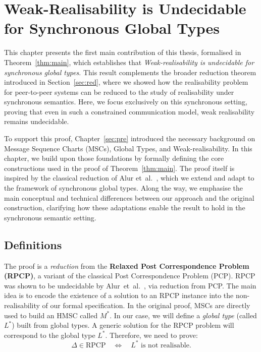 \chapter{Weak-Realisability is Undecidable for Synchronous Global Types}
\label{sec:proof}

This chapter presents the first main contribution of this thesis, formalised in
Theorem~\ref{thm:main}, which establishes that 
\emph{Weak-realisability is undecidable for synchronous global types}.  
This result complements the broader reduction theorem introduced in
Section~\ref{sec:red}, where we showed how the realisability problem for
peer-to-peer systems can be reduced to the study of realisability under
synchronous semantics.  
Here, we focus exclusively on this synchronous setting, proving that even in such
a constrained communication model, weak realisability remains undecidable.

To support this proof, Chapter~\ref{sec:pre} introduced the necessary background on
Message Sequence Charts (MSCs), Global Types, and Weak-realisability.  
In this chapter, we build upon those foundations by formally defining the
core constructions used in the proof of Theorem~\ref{thm:main}.  
The proof itself is inspired by the classical reduction of 
Alur et~al.~\cite{alur2005realizability}, which we extend and adapt to the
framework of synchronous global types.  
Along the way, we emphasise the main conceptual and technical differences
between our approach and the original construction, clarifying how these 
adaptations enable the result to hold in the synchronous semantic setting.

\section{Definitions}
The proof is a \emph{reduction} from the
\textbf{Relaxed Post Correspondence Problem (RPCP)}, a variant of
the classical Post Correspondence Problem (PCP). 
RPCP was shown to be undecidable by
Alur~et~al.~\cite{alur2005realizability}, via reduction from PCP.
The main idea is to encode the existence of a
solution to an RPCP instance into the non-realisability of our formal
specification. In the original proof, MSCs are directly used to build an
HMSC called $M^*$. In our case, we will define a
\emph{global type} (called $L^*$) built from global types.
A generic solution for the RPCP problem will correspond to the global
type $L^*$. Therefore, we need to prove:
$$
\Delta \in \text{RPCP} \quad\iff\quad L^* \text{ is not realisable}.
$$

